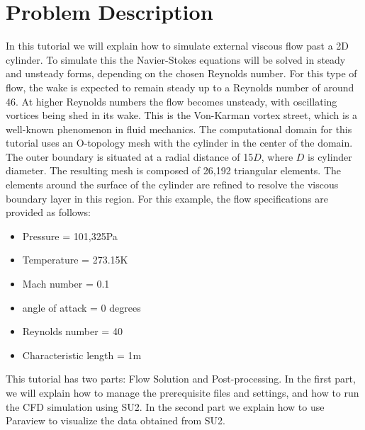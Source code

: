\section{Problem Description}
In this tutorial we will explain how to simulate external viscous flow past a 2D cylinder. To simulate this the Navier-Stokes equations will be solved in steady and unsteady forms, depending on the chosen Reynolds number. For this type of flow, the wake is expected to remain steady up to a Reynolds number of around 46. At higher Reynolds numbers the flow becomes unsteady, with oscillating vortices being shed in its wake. This is the  Von-Karman vortex street, which is a well-known phenomenon in fluid mechanics. The computational domain for this tutorial uses an O-topology mesh with the cylinder in the center of the domain. The outer boundary is situated at a radial distance of 15$D$, where $D$ is cylinder diameter. The resulting mesh is composed of 26,192 triangular elements. The elements around the surface of the cylinder are refined to resolve the viscous boundary layer in this region.  For this example, the flow specifications are provided as follows:
\begin{itemize}
    \item Pressure = 101,325Pa
    \item Temperature = 273.15K
    \item Mach number = 0.1
    \item angle of attack = 0 degrees
    \item Reynolds number = 40
    \item Characteristic length = 1m
\end{itemize}
This tutorial has two parts: Flow Solution and Post-processing. In the first part, we will explain how to manage the prerequisite files and settings, and how to run the CFD simulation using SU2. In the second part we explain how to use Paraview to visualize the data obtained from SU2.

